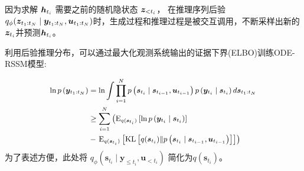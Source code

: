 因为求解 $\boldsymbol{h}_{t_i}$ 需要之前的随机隐状态 $\boldsymbol z_{<t_i}$， 在推理序列后验$q_{\phi}(\boldsymbol z_{t_1:t_N}\mid\boldsymbol y_{t_1:t_N},\boldsymbol u_{t_1:t_N})$时，生成过程和推理过程是被交互调用，不断采样出新的$\boldsymbol{z}_{t_i}$并预测$\boldsymbol{h}_{t_i}$。


利用后验推理分布，可以通过最大化观测系统输出的证据下界(ELBO)训练ODE-RSSM模型:

\begin{equation}
\small
\begin{aligned} 
\ln p\left(\boldsymbol{y}_{t_{1}: t_{N}}\right)&=\ln \int \prod_{i=1}^{N} p\left(\boldsymbol{s}_{t_{i}} \mid \boldsymbol{s}_{t_{i-1}},\boldsymbol{u}_{t_{i-1}} \right) p\left(\boldsymbol{y}_{t_{i}} \mid \boldsymbol{s}_{t_{i}}\right) d \boldsymbol{s}_{t_{1}: t_{N}} \\ 
 &\geq\sum_{i=1}^{N}\left(\mathrm{E}_{q(\boldsymbol{s}_{t_{i}})}\left[\ln p\left(\boldsymbol{y}_{t_{i}} \mid \boldsymbol{s}_{t_{i}}\right)\right]\right.\\
&-\left.\mathrm{E}_{q(\boldsymbol{s}_{t_{i}})}\left[\operatorname{KL}\left[q(\boldsymbol{s}_{t_{i}}) \| p\left(\boldsymbol{s}_{t_{i}} \mid \boldsymbol{s}_{t_{i-1}},\boldsymbol{u}_{t_{i-1}}\right)\right]\right]\right)
\end{aligned}
\label{equ:loss_single}
\end{equation}
为了表述方便，此处将 $q_\phi\left(\boldsymbol{s}_{t_{i}} \mid \boldsymbol{y}_{\leq t_i},\boldsymbol{u}_{<t_{i}} \right)$ 简化为$q(\boldsymbol{s}_{t_{i}})$。

